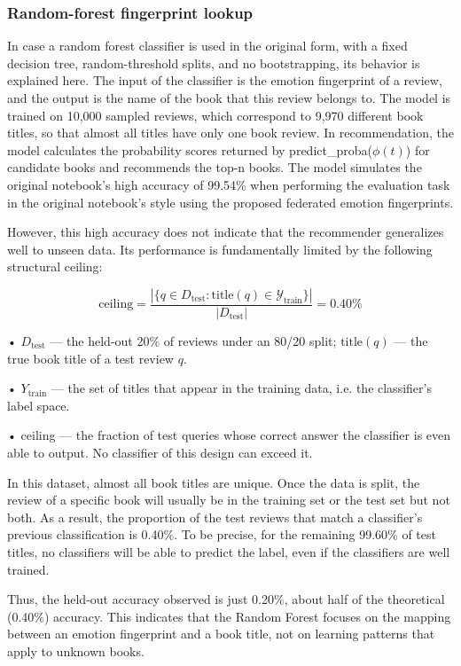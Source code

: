 \subsubsection{Random-forest fingerprint lookup}
In case a random forest classifier is used in the original form, with a fixed decision tree, random-threshold splits, and no bootstrapping, its behavior is explained here. The input of the classifier is the emotion fingerprint of a review, and the output is the name of the book that this review belongs to. The model is trained on 10,000 sampled reviews, which correspond to 9,970 different book titles, so that almost all titles have only one book review. In recommendation, the model calculates the probability scores returned by predict\_proba($\phi(t)$) for candidate books and recommends the top-n books. The model simulates the original notebook's high accuracy of 99.54\% when performing the evaluation task in the original notebook's style using the proposed federated emotion fingerprints.

However, this high accuracy does not indicate that the recommender generalizes well to unseen data. Its performance is fundamentally limited by the following structural ceiling:

\begin{equation}
  \text{ceiling} = \frac{\left| \{ q \in D_{\text{test}} : \text{title}(q) \in \mathcal{Y}_{\text{train}} \} \right|}{|D_{\text{test}}|} = 0.40\%
  \label{eq:ch4_4_10}
\end{equation}

• $D_{\text{test}}$ --- the held-out 20\% of reviews under an 80/20 split; $\text{title}(q)$ --- the true book title of a test review $q$.

• $Y_{\text{train}}$ --- the set of titles that appear in the training data, i.e. the classifier’s label space.

• ceiling --- the fraction of test queries whose correct answer the classifier is even able to output. No classifier of this design can exceed it.

In this dataset, almost all book titles are unique. Once the data is split, the review of a specific book will usually be in the training set or the test set but not both. As a result, the proportion of the test reviews that match a classifier's previous classification is 0.40\%. To be precise, for the remaining 99.60\% of test titles, no classifiers will be able to predict the label, even if the classifiers are well trained.

Thus, the held-out accuracy observed is just 0.20\%, about half of the theoretical (0.40\%) accuracy. This indicates that the Random Forest focuses on the mapping between an emotion fingerprint and a book title, not on learning patterns that apply to unknown books.

